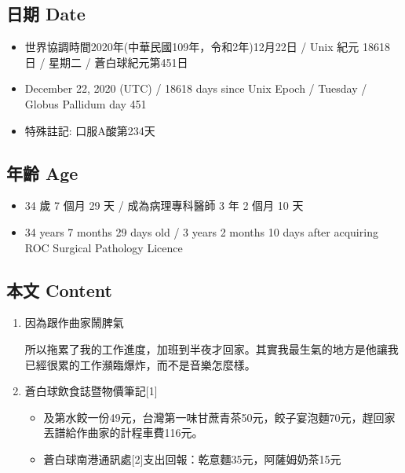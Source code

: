 \documentclass[
]{article}
\providecommand{\tightlist}{%
  \setlength{\itemsep}{0pt}\setlength{\parskip}{0pt}}
\begin{document}
\hypertarget{ux65e5ux671f-date-21}{%
\subsection{日期 Date}\label{ux65e5ux671f-date-21}}

\begin{itemize}
\tightlist
\item
  世界協調時間2020年(中華民國109年，令和2年)12月22日 / Unix 紀元 18618
  日 / 星期二 / 蒼白球紀元第451日
\item
  December 22, 2020 (UTC) / 18618 days since Unix Epoch / Tuesday /
  Globus Pallidum day 451
\item
  特殊註記: 口服A酸第234天
\end{itemize}

\hypertarget{ux5e74ux9f61-age-21}{%
\subsection{年齡 Age}\label{ux5e74ux9f61-age-21}}

\begin{itemize}
\tightlist
\item
  34 歲 7 個月 29 天 / 成為病理專科醫師 3 年 2 個月 10 天
\item
  34 years 7 months 29 days old / 3 years 2 months 10 days after
  acquiring ROC Surgical Pathology Licence
\end{itemize}

\hypertarget{ux672cux6587-content-21}{%
\subsection{本文 Content}\label{ux672cux6587-content-21}}

\begin{enumerate}
\def\labelenumi{\arabic{enumi}.}
\item
  因為跟作曲家鬧脾氣

  所以拖累了我的工作進度，加班到半夜才回家。其實我最生氣的地方是他讓我已經很累的工作瀕臨爆炸，而不是音樂怎麼樣。
\item
  蒼白球飲食誌暨物價筆記{[}1{]}

  \begin{itemize}
  \tightlist
  \item
    及第水餃一份49元，台灣第一味甘蔗青茶50元，餃子宴泡麵70元，趕回家丟譜給作曲家的計程車費116元。
  \item
    蒼白球南港通訊處{[}2{]}支出回報：乾意麵35元，阿薩姆奶茶15元
  \end{itemize}
\end{enumerate}
\end{document}

